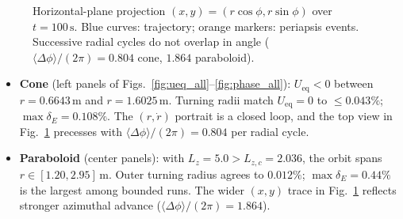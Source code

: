 \documentclass[11pt,letterpaper]{article}
\begin{document}
\begin{figure}[htbp]
  \centering
  \caption{Horizontal-plane projection $(x,y)=(r\cos\phi,r\sin\phi)$ over $t=100\,\mathrm{s}$. Blue curves: trajectory; orange markers: periapsis events. Successive radial cycles do not overlap in angle ($\langle\Delta\phi\rangle/(2\pi)=0.804$ cone, $1.864$ paraboloid).}
  \label{fig:xy_precession}
\end{figure}

\begin{summarybox}
\begin{itemize}[leftmargin=1.5em, itemsep=0.45em, topsep=0.2em]
    \item \textbf{Cone} (left panels of Figs.~\ref{fig:ueq_all}--\ref{fig:phase_all}): $U_{\mathrm{eq}}<0$ between $r=0.6643\,\mathrm{m}$ and $r=1.6025\,\mathrm{m}$. Turning radii match $U_{\mathrm{eq}}=0$ to $\le 0.043\%$; $\max\delta_E=0.108\%$. The $(r,\dot{r})$ portrait is a closed loop, and the top view in Fig.~\ref{fig:xy_precession} precesses with $\langle\Delta\phi\rangle/(2\pi)=0.804$ per radial cycle.
    \item \textbf{Paraboloid} (center panels): with $L_z=5.0>L_{z,c}=2.036$, the orbit spans $r\in[1.20,2.95]\,\mathrm{m}$. Outer turning radius agrees to $0.012\%$; $\max\delta_E=0.44\%$ is the largest among bounded runs. The wider $(x,y)$ trace in Fig.~\ref{fig:xy_precession} reflects stronger azimuthal advance ($\langle\Delta\phi\rangle/(2\pi)=1.864$).
\end{itemize}
\end{summarybox}
\end{document}
